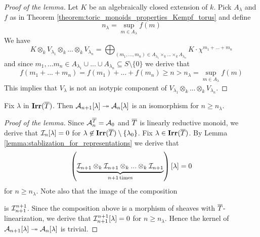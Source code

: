 \begin{proof}[Proof of the lemma]
Let $K$ be an algebraically closed extension of $k$. Pick $A_{\lambda}$ and $f$ as in Theorem \ref{theorem:toric_monoids_properties_Kempf_torus} and define
$$n_{\lambda} = \sup_{m\in A_{\lambda}}f(m)$$
We have
$$K\otimes_kV_{\lambda_1}\otimes_k...\otimes_kV_{\lambda_n} = \bigoplus_{(m_1,...,m_n)\in A_{\lambda_1}\times_k ...\times_k A_{\lambda_n}}K\cdot \chi^{m_1+...+m_n}$$
and since $m_1,...m_n\in A_{\lambda_1}\cup ...\cup A_{\lambda_n}\subseteq S\setminus \{0\}$ we derive that
$$f(m_1+...+m_n) = f(m_1) + ... + f(m_n) \geq n > n_{\lambda} = \sup_{m\in A_{\lambda}}f(m)$$
This implies that $V_{\lambda}$ is not an isotypic component of $V_{\lambda_1}\otimes_k...\otimes_kV_{\lambda_n}$.
\end{proof}

\begin{lemma}\label{lemma:stabilization_for_formal_schemes}
Fix $\lambda$ in $\mathbf{Irr}(\overline{T})$. Then ${\mathcal A}_{n+1}[\lambda]\twoheadrightarrow {\mathcal A}_n[\lambda]$ is an isomorphism for $n \geq  n_{\lambda}$.
\end{lemma}
\begin{proof}[Proof of the lemma]
Since ${\mathcal A}_n^{\overline{T}} = {\mathcal A}_0$ and $\overline{T}$ is linearly reductive monoid, we derive that ${\mathcal I}_n[\lambda] = 0$ for $\lambda \not \in \mathbf{Irr}(\overline{T})\setminus \{\lambda_0\}$. Fix $\lambda \in \mathbf{Irr}(\overline{T})$. By Lemma \ref{lemma:stablization_for_representations} we derive that
$$\left(\underbrace{{\mathcal I}_{n+1}\otimes_{k}{\mathcal I}_{n+1}\otimes_{k}...\otimes_{k}{\mathcal I}_{n+1}}_{n+1\,\mathrm{times}}\right)[\lambda] = 0$$
for $n \geq n_{\lambda}$. Note also that the image of the composition 
\begin{center}
\end{center}
is ${\mathcal I}_{n+1}^{n+1}$. Since the composition above is a morphism of sheaves with $\overline{T}$-linearization, we derive that ${\mathcal I}_{n+1}^{n+1}[\lambda]=0$ for $n \geq n_{\lambda}$. Hence the kernel of ${\mathcal A}_{n+1}[\lambda]\twoheadrightarrow {\mathcal A}_n[\lambda]$ is trivial.
\end{proof}

